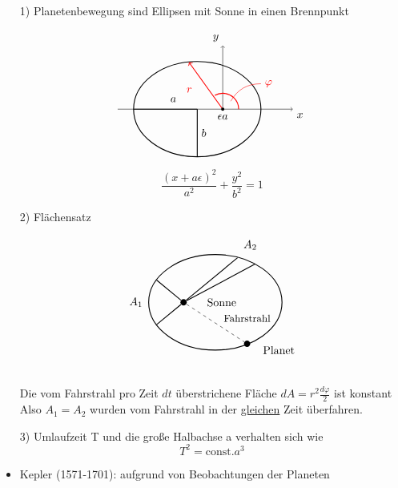 \documentclass[titlepage,12pt,a4paper,ngerman]{report}
\newcommand{\tx}[1]{\textrm{#1}}
\begin{document}
{\newpage
\begin{itemize}
	\item[1)] Planetenbewegung sind Ellipsen mit Sonne in einen Brennpunkt\\
	\begin{minipage}{.5\linewidth}
		$$
		\begin{tikzpicture}
		\draw[->] (-2.5,0) -- (3,0) node[anchor=north west] {$x$};
		\draw[->] (.8,0) -- (.8,2) node[anchor=south east] {$y$};
		\draw[thick] (0,0) ellipse (2cm and 1.5cm);
		\draw[thick] (0,0)--(0,-1.5)  (0,-.75) node[right] {$b$};
		\draw[thick] (0,0)--(-2,0);
		\node at (-.75,.3) {$a$};
		\draw[red,thick] (.8+.5,0) arc (0:120:.5);
		\draw[red] (0.8+.25,.25) to [out=60,in=180 ] (2,.8) node[right] {$\varphi$};
		\draw[->,thick,red] (.8,0) -- (100:1.5cm);
		\node[red] at (-.25,.6) {$r$};
		\node at (.8,-.25) {$\epsilon a$};
		\node[circle, fill=black, inner sep=1] at (.8,0) {};
		\end{tikzpicture} 
		$$
	\end{minipage}
	\begin{minipage}{.5\linewidth}
		$$\frac{(x+a\epsilon)^2}{a^2} + \frac{y^2}{b^2} = 1$$
	\end{minipage}
	\item[2)] Flächensatz
	\begin{minipage}{.7\linewidth}
		$$
		\begin{tikzpicture}
		\draw[thick] (1,0) ellipse (2.1cm and 1.5cm);
		\node[circle,fill=black,inner sep=2] (a) at (2,-1.3) {};
		\node at (3,-1.5) {Planet}; 
		\node at (1.2,-0) {Sonne};
		\node at (2,-.5) {\small{Fahrstrahl}};
		\node[circle, fill=black,inner sep=2] (b) at (0,0) {};
		\draw[dashed] (b) -- (a);
		\draw[thick] (b) -- (2.25,1.2);
		\draw[thick] (b) -- (1.7,1.4);
		\draw[thick] (b) -- (-0.85,0.7);
		\draw[thick] (b) -- (-0.85,-0.7);
		\node at (-1.5,0) {$A_1$};
		\node at (2.1,1.8) {$A_2$};
		\end{tikzpicture}
		$$
	\end{minipage}\\[5pt]
	Die vom Fahrstrahl pro Zeit $ dt $ überstrichene Fläche $ dA = r^2 \frac{d\varphi}{2} $ ist konstant\\
	Also $ A_1 = A_2 $ wurden vom Fahrstrahl in der \underline{gleichen} Zeit überfahren.
	\item[3)] Umlaufzeit  T und die große Halbachse a verhalten sich wie
	$$ T^2 = \tx{const.} a^3$$
\end{itemize}
\begin{itemize}
	\item Kepler (1571-1701): aufgrund von Beobachtungen der Planeten

\end{itemize}}
\end{document}
